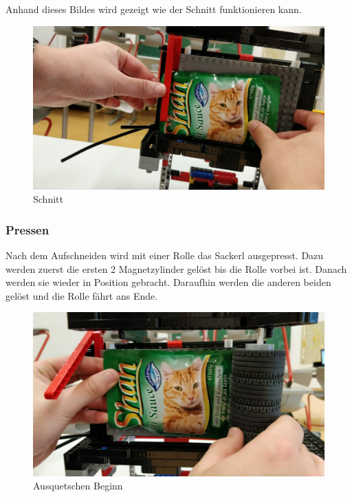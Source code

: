 Anhand dieses Bildes wird gezeigt wie der Schnitt funktionieren kann.

\begin{figure}[H]
\begin{center}
\includegraphics[width=13cm]{Bilder/Ablauf_1_png/Schnitt}
\caption{Schnitt}
\end{center}
\end{figure} 

\newpage
\subsubsection{Pressen}

Nach dem Aufschneiden wird mit einer Rolle das Sackerl ausgepresst. Dazu werden zuerst die ersten 2 Magnetzylinder gelöst bis die Rolle vorbei ist. Danach werden sie wieder in Position gebracht. Daraufhin werden die anderen beiden gelöst und die Rolle fährt ans Ende.

\begin{figure}[H]
\begin{center}
\includegraphics[width=13cm]{Bilder/Ablauf_1_png/Ausquetschen_1}
\caption{Ausquetschen Beginn}
\end{center}
\end{figure}

